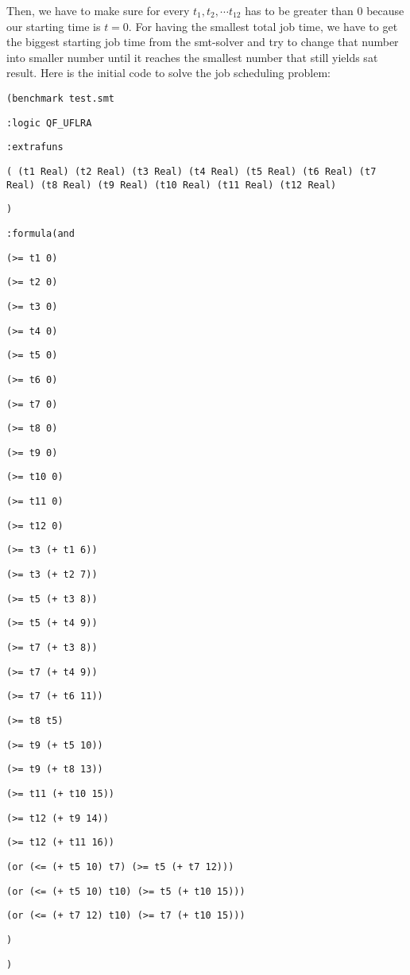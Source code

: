 \documentclass[12pt]{article}
\begin{document}
Then, we have to make sure for every $t_1, t_2, \cdots t_12$ has to be greater than 0 because our starting time is $t=0$. For having the smallest total job time, we have to get the biggest starting job time from the smt-solver and try to change that number into smaller number until it reaches the smallest number that still yields sat result. Here is the initial code to solve the job scheduling problem: 
{\footnotesize

{\tt (benchmark test.smt }

{\tt :logic QF\_UFLRA }

{\tt :extrafuns }

{\tt ( (t1 Real) (t2 Real) (t3 Real) (t4 Real) (t5 Real) (t6 Real) (t7 Real) (t8 Real) (t9 Real) (t10 Real) (t11 Real) (t12 Real) }

{\tt ) }

{\tt :formula(and  }

{\tt (>= t1 0) }

{\tt (>= t2 0) }

{\tt (>= t3 0) }

{\tt (>= t4 0) }

{\tt (>= t5 0) }

{\tt (>= t6 0) }

{\tt (>= t7 0) }

{\tt (>= t8 0) }

{\tt (>= t9 0) }

{\tt (>= t10 0) }

{\tt (>= t11 0) }

{\tt (>= t12 0) }

{\tt (>= t3 (+ t1 6)) }

{\tt (>= t3 (+ t2 7)) }

{\tt (>= t5 (+ t3 8)) }

{\tt (>= t5 (+ t4 9)) }

{\tt (>= t7 (+ t3 8)) }

{\tt (>= t7 (+ t4 9)) }

{\tt (>= t7 (+ t6 11)) }

{\tt (>= t8 t5) }

{\tt (>= t9 (+ t5 10)) }

{\tt (>= t9 (+ t8 13)) }

{\tt (>= t11 (+ t10 15)) }

{\tt (>= t12 (+ t9 14)) }

{\tt (>= t12 (+ t11 16)) }

{\tt (or (<= (+ t5 10) t7) (>= t5 (+ t7 12))) }

{\tt (or (<= (+ t5 10) t10) (>= t5 (+ t10 15))) }

{\tt (or (<= (+ t7 12) t10) (>= t7 (+ t10 15))) }

{\tt  }

{\tt   }

{\tt  }

{\tt ) }

{\tt  }

{\tt ) }
	
}
\end{document}
